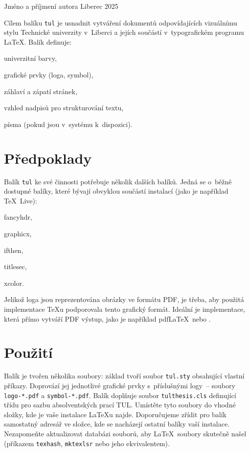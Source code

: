 \documentclass[a4paper,12pt,twoside,FP]{article}
\newcommand{\cmdfont}[1]{\texttt{\color{\tulcolor}#1}}
\begin{document}
{Jméno a příjmení autora}
{Liberec 2025}


Cílem balíku \cmdfont{tul} je usnadnit vytváření dokumentů odpovídajících
vizuálnímu stylu Technické univerzity v~Liberci a jejích součástí
v~typografickém programu \LaTeX. Balík definuje:

\begin{itemize*}
\item univerzitní barvy,
\item grafické prvky (loga, symbol),
\item záhlaví a zápatí stránek,
\item vzhled nadpisů pro strukturování textu,
\item písma (pokud jsou v~systému k~dispozici).
\end{itemize*}


\section{Předpoklady}

Balík \cmdfont{tul} ke své činnosti potřebuje několik dalších balíků. Jedná
se o~běžně dostupné balíky, které bývají obvyklou součástí instalací (jako je
například \TeX\ Live):

\begin{itemize*}
\item fancyhdr,
\item graphicx,
\item ifthen,
\item titlesec,
\item xcolor.
\end{itemize*}

Jelikož loga jsou reprezentována obrázky ve formátu PDF, je třeba, aby použitá
implementace \TeX u podporovala tento grafický formát. Ideální je implementace,
která přímo vytváří PDF výstup, jako je například pdf\LaTeX\ nebo \XeLaTeX.


\section{Použití}

Balík je tvořen několika soubory: základ tvoří soubor \cmdfont{tul.sty}
obsahující vlastní příkazy. Doprovází jej jednotlivé grafické prvky
s~příslušnými logy~-- soubory \cmdfont{logo-*.pdf} a \cmdfont{symbol-*.pdf}.
Balík doplňuje soubor \cmdfont{tulthesis.cls} definující třídu pro sazbu
absolventských prací TUL. Umístěte tyto soubory do vhodné složky, kde je vaše
instalace \LaTeX u najde. Doporučujeme zřídit pro balík samostatný adresář ve
složce, kde se nacházejí ostatní balíky vaší instalace. Nezapomeňte
aktualizovat databázi souborů, aby \LaTeX\ soubory skutečně našel (příkazem
\cmdfont{texhash}, \cmdfont{mktexlsr} nebo jeho ekvivalentem).
\end{document}
